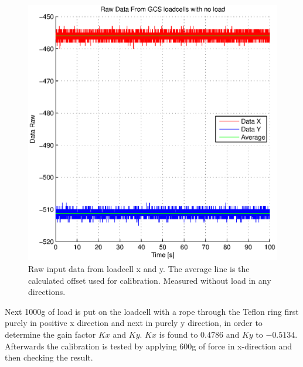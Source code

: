 \begin{figure}[H]
\centering
\includegraphics[scale=1]{graphics/gcs_test/calib_0_data_raw.eps}
\caption[Raw data from load cell]{Raw input data from loadcell x and y. The average line is the calculated offset used for calibration. Measured without load in any directions.}
\end{figure}

Next 1000g of load is put on the loadcell with a rope through the Teflon ring first purely in positive x direction and next in purely y direction, in order to determine the gain factor $Kx$ and $Ky$. $Kx$ is found to $0.4786$ and $Ky$ to $-0.5134$. Afterwards the calibration is tested by applying $600$g of force in x-direction and then checking the result.

